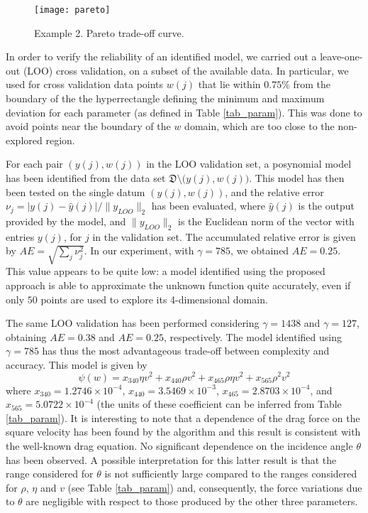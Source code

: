 \documentclass[11pt]{article}
\begin{document}
\begin{figure}
\centering
\texttt{[image: pareto]}
\caption{Example 2. Pareto trade-off curve.}
\label{pareto:figure2} 
\end{figure}


In order to verify the reliability of an identified model, we carried
out a leave-one-out (LOO) cross validation, on a subset of the available
data. In particular, we used for cross validation data points $w(j)$
that lie within $0.75\%$ from the boundary of the the hyperrectangle
defining the minimum and maximum deviation for each parameter (as
defined in Table \ref{tab_param}). This was done to avoid points
near the boundary of the $w$ domain, which are too close to the non-explored
region.

For each pair $(y(j),w(j))$ in the LOO validation set, a posynomial
model has been identified from the data set $\mathfrak{D}\setminus(\ensuremath{y(j),w(j))}$.
This model has then been tested on the single datum $(y(j),w(j))$,
and the relative error $\nu_{j}=|y(j)-\hat{y}(j)|/\|y_{LOO}\|_{2}$
has been evaluated, where $\hat{y}(j)$ is the output provided by
the model, and $\|y_{LOO}\|_{2}$ is the Euclidean norm of the vector
with entries $y(j)$, for $j$ in the validation set. The accumulated
relative error is given by $AE=\sqrt{\sum_{j}\nu_{j}^{2}}$. In our
experiment, with $\gamma=785$, we obtained $AE=0.25$. This value
appears to be quite low: a model identified using the proposed approach
is able to approximate the unknown function quite accurately, even
if only $50$ points are used to explore its 4-dimensional domain.

The same LOO validation has been performed considering $\gamma=1438$
and $\gamma=127$, obtaining $AE=0.38$ and $AE=0.25$, respectively.
The model identified using $\gamma=785$ has thus the most advantageous
trade-off between complexity and accuracy. This model is given by
\[
\psi(w)=x_{340}\eta v^{2}+x_{440}\rho v^{2}+x_{465}\rho\eta v^{2}+x_{565}\rho^{2}v^{2}
\]
where $x_{340}=1.2746\times10^{-4}$, $x_{440}=3.5469\times10^{-3}$,
$x_{465}=2.8703\times10^{-4}$, and $x_{565}=5.0722\times10^{-4}$
(the units of these coefficient can be inferred from Table \ref{tab_param}).
It is interesting to note that a dependence of the drag force on the
square velocity has been found by the algorithm and this result is
consistent with the well-known drag equation. No significant dependence
on the incidence angle $\theta$ has been observed. A possible interpretation
for this latter result is that the range considered for $\theta$
is not sufficiently large compared to the ranges considered for $\rho$,
$\eta$ and $v$ (see Table \ref{tab_param}) and, consequently, the
force variations due to $\theta$ are negligible with respect to those
produced by the other three parameters.
\end{document}

